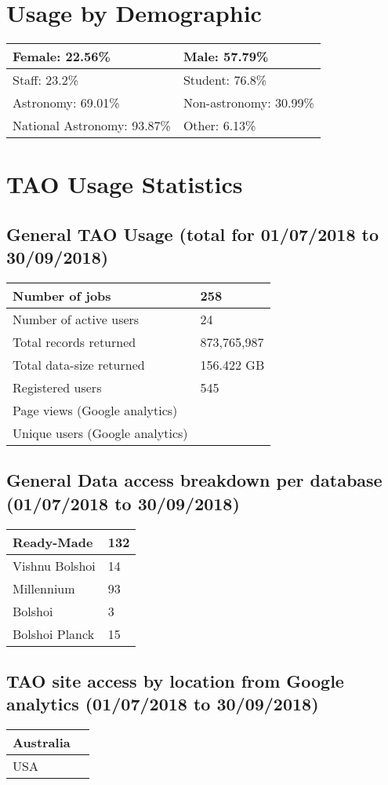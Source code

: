 \documentclass{article}%
\begin{document}
\section{Usage by Demographic}%

%
\begin{longtabu}{X[l] X[l]}%
Female:  22.56\%&Male:  57.79\%\\%
\hline%
Staff:  23.2\%&Student:  76.8\%\\%
\hline%
Astronomy:  69.01\%&Non{-}astronomy:  30.99\%\\%
\hline%
National Astronomy:  93.87\%&Other:  6.13\%\\%
\hline%
\end{longtabu}%
\newpage%
\section{TAO Usage Statistics}%

%
\subsection{General TAO Usage (total for 01/07/2018 to 30/09/2018)}%

%
\begin{longtabu}{X[l] X[l]}%
Number of jobs&258\\%
\hline%
Number of active users&24\\%
\hline%
Total records returned&873,765,987\\%
\hline%
Total data{-}size returned&156.422 GB\\%
\hline%
Registered users&545\\%
\hline%
Page views (Google analytics)&\\%
\hline%
Unique users (Google analytics)&\\%
\hline%
\end{longtabu}%
\subsection{General Data access breakdown per database (01/07/2018 to 30/09/2018)}%

%
\begin{longtabu}{X[l] X[l]}%
Ready{-}Made&132\\%
\hline%
Vishnu Bolshoi&14\\%
\hline%
Millennium&93\\%
\hline%
Bolshoi&3\\%
\hline%
Bolshoi Planck&15\\%
\hline%
\end{longtabu}%
\subsection{TAO site access by location from Google analytics (01/07/2018 to 30/09/2018)}%

%
\begin{longtabu}{X[l] X[l]}%
Australia&\\%
\hline%
USA&\\%
\hline%
\end{longtabu}%
\end{document}
